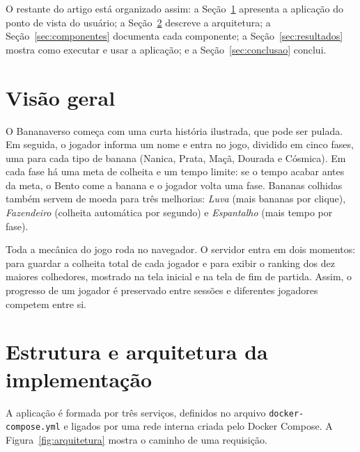 \documentclass[12pt]{article}
\begin{document}
O restante do artigo está organizado assim: a Seção~\ref{sec:visao}
apresenta a aplicação do ponto de vista do usuário; a
Seção~\ref{sec:arquitetura} descreve a arquitetura; a
Seção~\ref{sec:componentes} documenta cada componente; a
Seção~\ref{sec:resultados} mostra como executar e usar a aplicação; e a
Seção~\ref{sec:conclusao} conclui.

\section{Visão geral}\label{sec:visao}

O Bananaverso começa com uma curta história ilustrada, que pode ser
pulada. Em seguida, o jogador informa um nome e entra no jogo, dividido em
cinco fases, uma para cada tipo de banana (Nanica, Prata, Maçã, Dourada e
Cósmica). Em cada fase há uma meta de colheita e um tempo limite: se o
tempo acabar antes da meta, o Bento come a banana e o jogador volta uma
fase. Bananas colhidas também servem de moeda para três melhorias:
\emph{Luva} (mais bananas por clique), \emph{Fazendeiro} (colheita
automática por segundo) e \emph{Espantalho} (mais tempo por fase).

Toda a mecânica do jogo roda no navegador. O servidor entra em dois
momentos: para guardar a colheita total de cada jogador e para exibir o
ranking dos dez maiores colhedores, mostrado na tela inicial e na tela de
fim de partida. Assim, o progresso de um jogador é preservado entre
sessões e diferentes jogadores competem entre si.

\section{Estrutura e arquitetura da implementação}\label{sec:arquitetura}

A aplicação é formada por três serviços, definidos no arquivo
\texttt{docker-compose.yml} e ligados por uma rede interna criada pelo
Docker Compose. A Figura~\ref{fig:arquitetura} mostra o caminho de uma
requisição.
\end{document}
